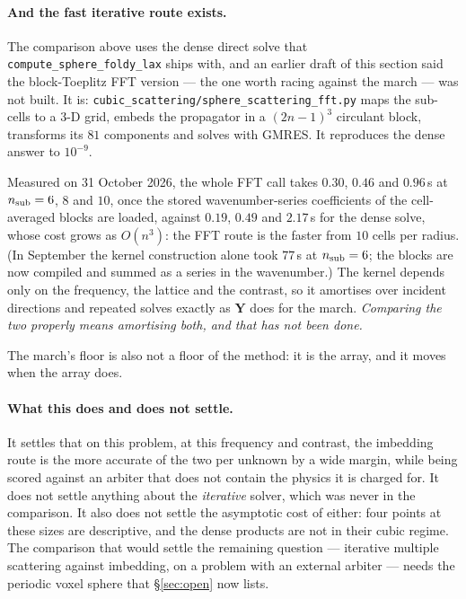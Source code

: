 \documentclass[11pt,a4paper]{article}
\newcommand{\bY}{\mathbf{Y}}
\begin{document}
\paragraph{And the fast iterative route exists.}  The comparison above uses the
dense direct solve that \texttt{compute\_sphere\_foldy\_lax} ships with, and an
earlier draft of this section said the block-Toeplitz FFT version --- the one
worth racing against the march --- was not built.  It is:
\texttt{cubic\_scattering/sphere\_scattering\_fft.py} maps the sub-cells to a
$3$-D grid, embeds the propagator in a $(2n-1)^3$ circulant block, transforms
its $81$ components and solves with GMRES.  It reproduces the dense answer to
$10^{-9}$.

Measured on 31 October 2026, the whole FFT call takes $0.30$, $0.46$ and
$0.96$\,s at $n_{\rm sub}=6$, $8$ and $10$, once the stored wavenumber-series
coefficients of the cell-averaged blocks are loaded, against $0.19$, $0.49$ and
$2.17$\,s for the dense solve, whose cost grows as $O(n^3)$: the FFT route is the
faster from $10$ cells per radius.  (In September the kernel construction alone
took $77$\,s at $n_{\rm sub}=6$; the blocks are now compiled and summed as a
series in the wavenumber.)  The kernel depends only on the frequency, the
lattice and the contrast, so it amortises over incident directions and repeated
solves exactly as $\bY$ does for the march.  \emph{Comparing the two properly
means amortising both, and that has not been done.}

The march's floor is also not a floor of the method: it is the array, and it
moves when the array does.

\paragraph{What this does and does not settle.}  It settles that on this
problem, at this frequency and contrast, the imbedding route is the more
accurate of the two per unknown by a wide margin, while being scored against an
arbiter that does not contain the physics it is charged for.  It does not settle
anything about the \emph{iterative} solver, which was never in the comparison.
It also does not settle the asymptotic cost of either: four points at these
sizes are descriptive, and the dense products are not in their cubic regime.
The comparison that would settle the remaining question --- iterative multiple
scattering against imbedding, on a problem with an external arbiter --- needs
the periodic voxel sphere that \S\ref{sec:open} now lists.
\end{document}
